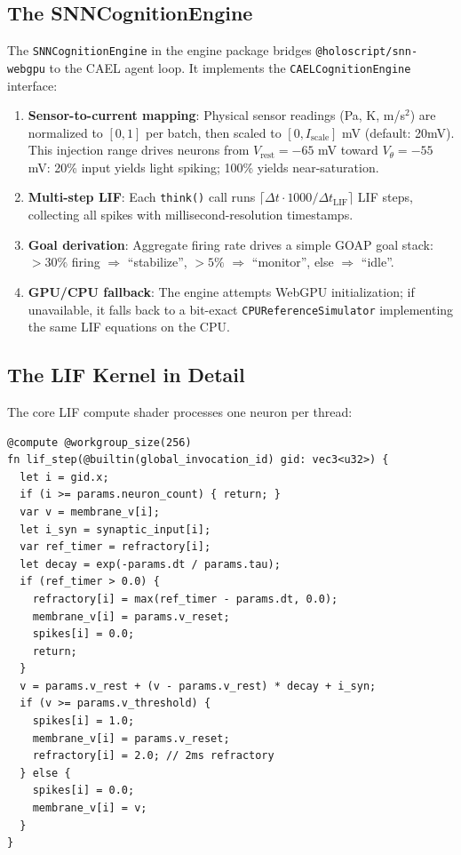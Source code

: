 \documentclass[10pt]{article}
\makeatletter
\newcommand{\snnwebgpu}{\texttt{@holoscript/snn-webgpu}}
\newcommand{\cael}{CAEL}
\makeatother
\begin{document}
\subsection{The SNNCognitionEngine}

The \texttt{SNNCognitionEngine} in the engine package bridges \snnwebgpu{} to
the \cael{} agent loop.
It implements the \texttt{CAELCognitionEngine} interface:

\begin{enumerate}
\item \textbf{Sensor-to-current mapping}: Physical sensor readings (Pa, K, m/s$^2$)
  are normalized to $[0, 1]$ per batch, then scaled to $[0, I_\mathrm{scale}]$ mV
  (default: 20mV).
  This injection range drives neurons from $V_\mathrm{rest} = -65$ mV toward
  $V_\theta = -55$ mV: 20\% input yields light spiking; 100\% yields near-saturation.

\item \textbf{Multi-step LIF}: Each \texttt{think()} call runs
  $\lceil \Delta t \cdot 1000 / \Delta t_\mathrm{LIF} \rceil$ LIF steps,
  collecting all spikes with millisecond-resolution timestamps.

\item \textbf{Goal derivation}: Aggregate firing rate drives a simple GOAP goal stack:
  $>30\%$ firing $\Rightarrow$ ``stabilize'',
  $>5\%$ $\Rightarrow$ ``monitor'',
  else $\Rightarrow$ ``idle''.

\item \textbf{GPU/CPU fallback}: The engine attempts WebGPU initialization; if
  unavailable, it falls back to a bit-exact \texttt{CPUReferenceSimulator}
  implementing the same LIF equations on the CPU.
\end{enumerate}

\subsection{The LIF Kernel in Detail}

The core LIF compute shader processes one neuron per thread:

\begin{verbatim}
@compute @workgroup_size(256)
fn lif_step(@builtin(global_invocation_id) gid: vec3<u32>) {
  let i = gid.x;
  if (i >= params.neuron_count) { return; }
  var v = membrane_v[i];
  let i_syn = synaptic_input[i];
  var ref_timer = refractory[i];
  let decay = exp(-params.dt / params.tau);
  if (ref_timer > 0.0) {
    refractory[i] = max(ref_timer - params.dt, 0.0);
    membrane_v[i] = params.v_reset;
    spikes[i] = 0.0;
    return;
  }
  v = params.v_rest + (v - params.v_rest) * decay + i_syn;
  if (v >= params.v_threshold) {
    spikes[i] = 1.0;
    membrane_v[i] = params.v_reset;
    refractory[i] = 2.0; // 2ms refractory
  } else {
    spikes[i] = 0.0;
    membrane_v[i] = v;
  }
}
\end{verbatim}
\end{document}

